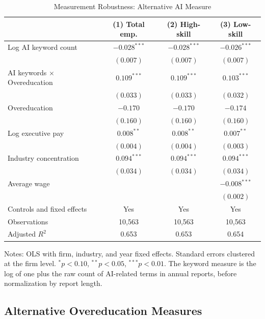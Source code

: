 \documentclass[12pt,a4paper]{article}
\theoremstyle{predstyle}
\theoremstyle{plain}
\begin{document}
\begin{table}[H]
\centering
\caption{Measurement Robustness: Alternative AI Measure}
\label{tab:lnwords}
\begin{threeparttable}
\scriptsize
\setlength{\tabcolsep}{4pt}
\begin{tabular}{lccc}
\toprule
 & (1) Total emp. & (2) High-skill & (3) Low-skill \\
\midrule
Log AI keyword count & \(-0.028^{***}\) & \(-0.028^{***}\) & \(-0.026^{***}\) \\
 & \((0.007)\) & \((0.007)\) & \((0.007)\) \\
AI keywords \(\times\) Overeducation & \(0.109^{***}\) & \(0.109^{***}\) & \(0.103^{***}\) \\
 & \((0.033)\) & \((0.033)\) & \((0.032)\) \\
Overeducation & \(-0.170\) & \(-0.170\) & \(-0.174\) \\
 & \((0.160)\) & \((0.160)\) & \((0.160)\) \\
Log executive pay & \(0.008^{**}\) & \(0.008^{**}\) & \(0.007^{**}\) \\
 & \((0.004)\) & \((0.004)\) & \((0.003)\) \\
Industry concentration & \(0.094^{***}\) & \(0.094^{***}\) & \(0.094^{***}\) \\
 & \((0.034)\) & \((0.034)\) & \((0.034)\) \\
Average wage & & & \(-0.008^{***}\) \\
 & & & \((0.002)\) \\
Controls and fixed effects & Yes & Yes & Yes \\
\midrule
Observations & 10,563 & 10,563 & 10,563 \\
Adjusted \(R^2\) & 0.653 & 0.653 & 0.654 \\
\bottomrule
\end{tabular}
\begin{tablenotes}
\footnotesize
\item Notes: OLS with firm, industry, and year fixed effects. Standard errors clustered at the firm level. \(^{*}p<0.10\), \(^{**}p<0.05\), \(^{***}p<0.01\). The keyword measure is the log of one plus the raw count of AI-related terms in annual reports, before normalization by report length.
\end{tablenotes}
\end{threeparttable}
\end{table}

\subsection{Alternative Overeducation Measures}
\end{document}
